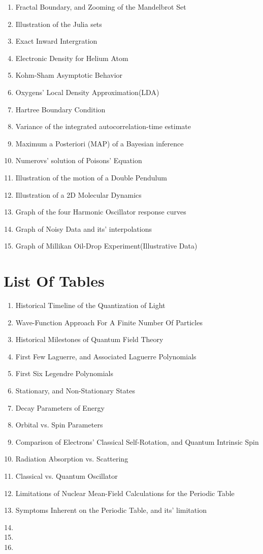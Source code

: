 \documentclass[a4paper, 10pt, onepage]{elegantbook}
\begin{document}
\begin{enumerate}
\item Fractal Boundary, and Zooming of the Mandelbrot Set
\item Illustration of the Julia sets
\item Exact Inward Intergration
\item Electronic Density for Helium Atom
\item Kohm-Sham Asymptotic Behavior
\item Oxygens' Local Density Approximation(LDA)
\item Hartree Boundary Condition
\item Variance of the integrated autocorrelation-time estimate
\item Maximum a Posteriori (MAP) of a Bayesian inference
\item Numerovs' solution of Poisons' Equation
\item Illustration of the motion of a Double Pendulum
\item Illustration of a 2D Molecular Dynamics
\item Graph of the four Harmonic Oscillator response curves
\item Graph of Noisy Data and its' interpolations
\item Graph of Millikan Oil-Drop Experiment(Illustrative Data)

\end{enumerate}

\newpage

\section{List Of Tables}

\begin{enumerate}

\item Historical Timeline of the Quantization of Light
\item Wave-Function Approach For A Finite Number Of Particles
\item Historical Milestones of Quantum Field Theory
\item First Few Laguerre, and Associated Laguerre Polynomials
\item First Six Legendre Polynomials
\item Stationary, and Non-Stationary States
\item Decay Parameters of Energy
\item Orbital vs. Spin Parameters
\item Comparison of Electrons' Classical Self-Rotation, and Quantum Intrinsic Spin
\item Radiation Absorption vs. Scattering
\item Classical vs. Quantum Oscillator
\item Limitations of Nuclear Mean-Field Calculations for the Periodic Table
\item Symptoms Inherent on the Periodic Table, and its' limitation
\item
\item
\item

\end{enumerate}
\end{document}
